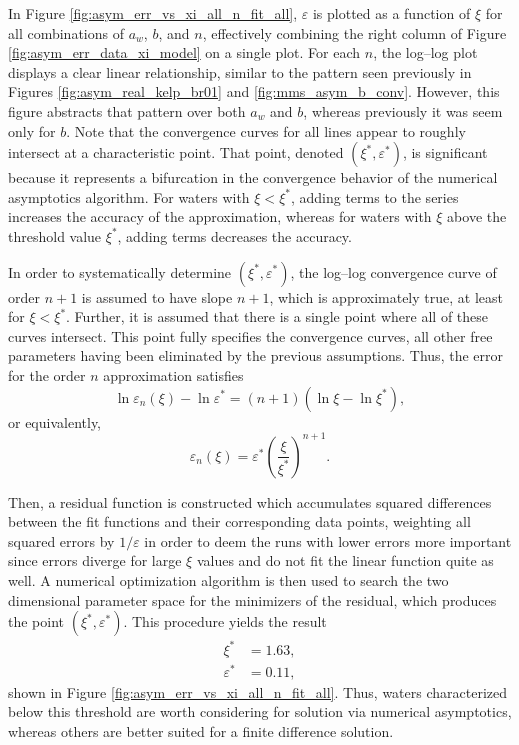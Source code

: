 \documentclass[ms,cpyr,lof,lot]{uathesis}
\begin{document}
In Figure \ref{fig:asym_err_vs_xi_all_n_fit_all}, $\varepsilon$ is plotted as a function of $\xi$ for all combinations of $a_w$, $b$, and $n$, effectively combining the right column of Figure \ref{fig:asym_err_data_xi_model} on a single plot.
For each $n$, the log--log plot displays a clear linear relationship, similar to the pattern seen previously in Figures \ref{fig:asym_real_kelp_br01} and \ref{fig:mms_asym_b_conv}.
However, this figure abstracts that pattern over both $a_w$ and $b$, whereas previously it was seem only for $b$.
Note that the convergence curves for all lines appear to roughly intersect at a characteristic point.
That point, denoted $(\xi^*, \varepsilon^*)$, is significant because it represents a bifurcation in the convergence behavior of the numerical asymptotics algorithm.
For waters with $\xi < \xi^*$, adding terms to the series increases the accuracy of the approximation, whereas for waters with $\xi$ above the threshold value $\xi^*$, adding terms decreases the accuracy.

In order to systematically determine $(\xi^*, \varepsilon^*)$, the log--log convergence curve of order $n+1$ is assumed to have slope $n+1$, which is approximately true, at least for $\xi<\xi^*$.
Further, it is assumed that there is a single point where all of these curves intersect.
This point fully specifies the convergence curves, all other free parameters having been eliminated by the previous assumptions.
Thus, the error for the order $n$ approximation satisfies
\begin{equation}
  \label{eqn:ln_eps_n}
  \ln\varepsilon_n(\xi) - \ln\varepsilon^* = (n+1)\left(\ln\xi - \ln\xi^*\right),
\end{equation}
or equivalently,
\begin{equation}
  \label{eqn:eps_n}
  \varepsilon_n(\xi) = \varepsilon^* \left(\frac{\xi}{\xi^*}\right)^{n+1}.
\end{equation}

Then, a residual function is constructed which accumulates squared differences between the fit functions and their corresponding data points, weighting all squared errors by $1/\varepsilon$ in order to deem the runs with lower errors more important since errors diverge for large $\xi$ values and do not fit the linear function quite as well.
A numerical optimization algorithm is then used to search the two dimensional parameter space for the minimizers of the residual, which produces the point $(\xi^*, \varepsilon^*)$.
This procedure yields the result
\begin{align}
  \xi^* &= 1.63, \\
  \varepsilon^* &= 0.11,
\end{align}
shown in Figure \ref{fig:asym_err_vs_xi_all_n_fit_all}.
Thus, waters characterized below this threshold are worth considering for solution via numerical asymptotics, whereas others are better suited for a finite difference solution.
\end{document}
